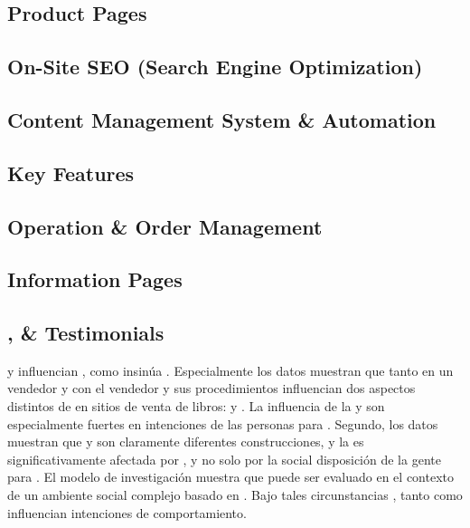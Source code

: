 \subsection{Product Pages}

\subsection{On-Site SEO (Search Engine Optimization)}

\subsection{Content Management System \& Automation}

\subsection{Key \ecommerce Features}

\subsection{Operation \& Order Management}

\subsection{Information Pages}

\subsection{\security, \trust \& Testimonials}

\trust y \familiarity influencian \ecommerce, como insinúa \luhmanntheory. Especialmente los datos muestran que tanto \trust en un vendedor \internet y \familiarity con el vendedor y sus procedimientos influencian dos aspectos distintos de \ecommerce en sitios de venta de libros: \inquiry y \purchase. La influencia de la  \familiarity y \trust son especialmente fuertes en intenciones  de las personas para \purchase. Segundo, los datos muestran que \trust y \familiarity son claramente diferentes construcciones, y la \trust es significativamente afectada por \familiarity, y no solo por la social disposición de la gente para \trust. El modelo de investigación muestra que  \ecommerce puede ser evaluado en el contexto de un ambiente social complejo basado en \luhmanntheory. Bajo tales circunstancias , tanto \trust como \familiarity influencian intenciones de comportamiento\cite{gefen2000commerce}.

